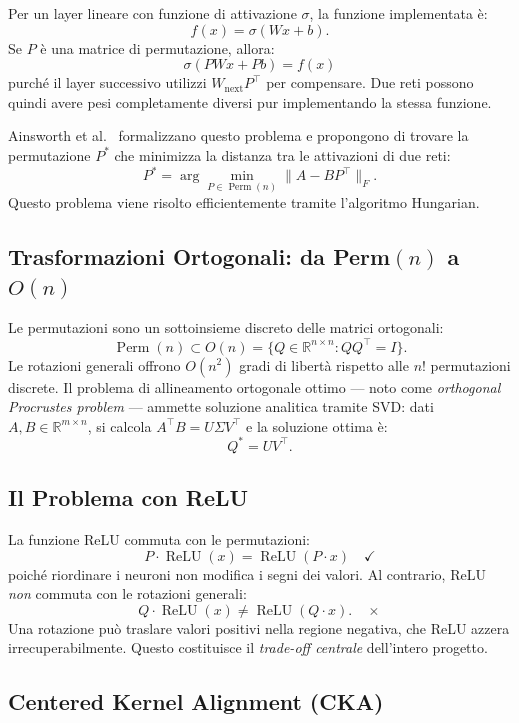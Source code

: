 \documentclass[11pt, a4paper]{article}
\begin{document}
Per un layer lineare con funzione di attivazione $\sigma$, la funzione implementata è:
\[
f(x) = \sigma(Wx + b).
\]
Se $P$ è una matrice di permutazione, allora:
\[
\sigma(PWx + Pb) = f(x)
\]
purché il layer successivo utilizzi $W_{\text{next}} P^\top$ per compensare. Due reti possono quindi avere pesi completamente diversi pur implementando la stessa funzione.

Ainsworth et al.\ \cite{ainsworth2022} formalizzano questo problema e propongono di trovare la permutazione $P^*$ che minimizza la distanza tra le attivazioni di due reti:
\[
P^* = \arg\min_{P \in \operatorname{Perm}(n)} \|A - BP^\top\|_F.
\]
Questo problema viene risolto efficientemente tramite l'algoritmo Hungarian.

\subsection{Trasformazioni Ortogonali: da Perm$(n)$ a $O(n)$}

Le permutazioni sono un sottoinsieme discreto delle matrici ortogonali:
\[
\operatorname{Perm}(n) \subset O(n) = \{ Q \in \mathbb{R}^{n \times n} : QQ^\top = I \}.
\]
Le rotazioni generali offrono $O(n^2)$ gradi di libertà rispetto alle $n!$ permutazioni discrete. Il problema di allineamento ortogonale ottimo — noto come \emph{orthogonal Procrustes problem} — ammette soluzione analitica tramite SVD: dati $A, B \in \mathbb{R}^{m \times n}$, si calcola $A^\top B = U\Sigma V^\top$ e la soluzione ottima è:
\[
Q^* = UV^\top.
\]

\subsection{Il Problema con ReLU}

La funzione ReLU commuta con le permutazioni:
\[
P \cdot \operatorname{ReLU}(x) = \operatorname{ReLU}(P \cdot x) \quad \checkmark
\]
poiché riordinare i neuroni non modifica i segni dei valori. Al contrario, ReLU \emph{non} commuta con le rotazioni generali:
\[
Q \cdot \operatorname{ReLU}(x) \neq \operatorname{ReLU}(Q \cdot x). \quad \times
\]
Una rotazione può traslare valori positivi nella regione negativa, che ReLU azzera irrecuperabilmente. Questo costituisce il \emph{trade-off centrale} dell'intero progetto.

\subsection{Centered Kernel Alignment (CKA)}
\end{document}
